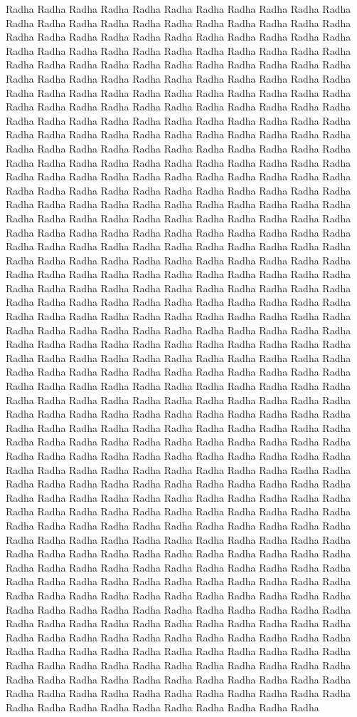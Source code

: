 Radha Radha Radha Radha Radha Radha Radha Radha Radha Radha Radha Radha Radha Radha Radha Radha Radha Radha Radha Radha Radha
Radha Radha Radha Radha Radha Radha Radha Radha Radha Radha Radha Radha Radha Radha Radha Radha Radha Radha Radha Radha Radha 
Radha Radha Radha Radha Radha Radha Radha Radha Radha Radha Radha Radha Radha Radha Radha Radha Radha Radha Radha Radha Radha
Radha Radha Radha Radha Radha Radha Radha Radha Radha Radha Radha Radha Radha Radha Radha Radha Radha Radha Radha Radha Radha
Radha Radha Radha Radha Radha Radha Radha Radha Radha Radha Radha Radha Radha Radha Radha Radha Radha Radha Radha Radha Radha
Radha Radha Radha Radha Radha Radha Radha Radha Radha Radha Radha Radha Radha Radha Radha Radha Radha Radha Radha Radha Radha
Radha Radha Radha Radha Radha Radha Radha Radha Radha Radha Radha Radha Radha Radha Radha Radha Radha Radha Radha Radha Radha
Radha Radha Radha Radha Radha Radha Radha Radha Radha Radha Radha Radha Radha Radha Radha Radha Radha Radha Radha Radha Radha 
Radha Radha Radha Radha Radha Radha Radha Radha Radha Radha Radha Radha Radha Radha Radha Radha Radha Radha Radha Radha Radha 
Radha Radha Radha Radha Radha Radha Radha Radha Radha Radha Radha Radha Radha Radha Radha Radha Radha Radha Radha Radha Radha 
Radha Radha Radha Radha Radha Radha Radha Radha Radha Radha Radha Radha Radha Radha Radha Radha Radha Radha Radha Radha Radha 
Radha Radha Radha Radha Radha Radha Radha Radha Radha Radha Radha Radha Radha Radha Radha Radha Radha Radha Radha Radha Radha
Radha Radha Radha Radha Radha Radha Radha Radha Radha Radha Radha Radha Radha Radha Radha Radha Radha Radha Radha Radha Radha 
Radha Radha Radha Radha Radha Radha Radha Radha Radha Radha Radha Radha Radha Radha Radha Radha Radha Radha Radha Radha Radha
Radha Radha Radha Radha Radha Radha Radha Radha Radha Radha Radha Radha Radha Radha Radha Radha Radha Radha Radha Radha Radha 
Radha Radha Radha Radha Radha Radha Radha Radha Radha Radha Radha Radha Radha Radha Radha Radha Radha Radha Radha Radha Radha 
Radha Radha Radha Radha Radha Radha Radha Radha Radha Radha Radha Radha Radha Radha Radha Radha Radha Radha Radha Radha Radha 
Radha Radha Radha Radha Radha Radha Radha Radha Radha Radha Radha Radha Radha Radha Radha Radha Radha Radha Radha Radha Radha 
Radha Radha Radha Radha Radha Radha Radha Radha Radha Radha Radha Radha Radha Radha Radha Radha Radha Radha Radha Radha Radha 
Radha Radha Radha Radha Radha Radha Radha Radha Radha Radha Radha Radha Radha Radha Radha Radha Radha Radha Radha Radha Radha 
Radha Radha Radha Radha Radha Radha Radha Radha Radha Radha Radha Radha Radha Radha Radha Radha Radha Radha Radha Radha Radha 
Radha Radha Radha Radha Radha Radha Radha Radha Radha Radha Radha Radha Radha Radha Radha Radha Radha Radha Radha Radha Radha 
Radha Radha Radha Radha Radha Radha Radha Radha Radha Radha Radha Radha Radha Radha Radha Radha Radha Radha Radha Radha Radha
Radha Radha Radha Radha Radha Radha Radha Radha Radha Radha Radha Radha Radha Radha Radha Radha Radha Radha Radha Radha Radha
Radha Radha Radha Radha Radha Radha Radha Radha Radha Radha Radha Radha Radha Radha Radha Radha Radha Radha Radha Radha Radha
Radha Radha Radha Radha Radha Radha Radha Radha Radha Radha Radha Radha Radha Radha Radha Radha Radha Radha Radha Radha Radha
Radha Radha Radha Radha Radha Radha Radha Radha Radha Radha Radha Radha Radha Radha